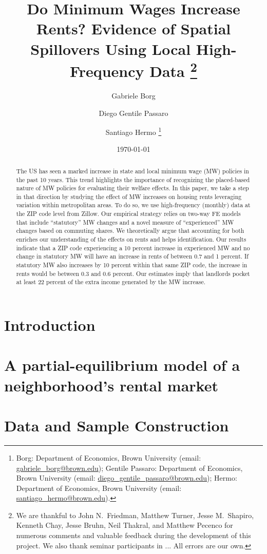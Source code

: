 \documentclass{article}
\title{ Do Minimum Wages Increase Rents? 
        Evidence of Spatial Spillovers Using Local High-Frequency Data
        \thanks{We are thankful to John N.\ Friedman, Matthew Turner, Jesse M.\ Shapiro, 
        Kenneth Chay, Jesse Bruhn, Neil Thakral, and Matthew Pecenco for numerous 
        comments and valuable feedback during the development of this project.
        We also thank seminar participants in ... %
        All errors are our own.}}
\author{Gabriele Borg \and Diego Gentile Passaro \and Santiago Hermo
        \footnote{
        Borg: Department of Economics, Brown University 
        (email: \url{gabriele_borg@brown.edu}); 
        Gentile Passaro: Department of Economics, Brown University 
        (email: \url{diego_gentile_passaro@brown.edu}); 
        Hermo: Department of Economics, Brown University 
        (email: \url{santiago_hermo@brown.edu}).}}
\date{\today}
\begin{document}
\maketitle

\begin{abstract}
    \noindent
    The US has seen a marked increase in state and local minimum wage (MW) policies 
    in the past 10 years.
    This trend highlights the importance of recognizing the placed-based nature of 
    MW policies for evaluating their welfare effects.
    In this paper, we take a step in that direction by studying the effect of MW 
    increases on housing rents leveraging variation within metropolitan areas.
    To do so, we use high-frequency (monthly) data at the ZIP code level from Zillow.
    Our empirical strategy relies on two-way FE models that include ``statutory'' 
    MW changes and a novel measure of ``experienced'' MW changes based on commuting
    shares.
    We theoretically argue that accounting for both enriches our understanding of 
    the effects on rents and helps identification.
    Our results indicate that a ZIP code experiencing a 10 percent increase in 
    experienced MW and no change in statutory MW will have an increase in rents of
    between 0.7 and 1 percent.
    If statutory MW also increases by 10 percent within that same ZIP code, the 
    increase in rents would be between 0.3 and 0.6 percent.
    Our estimates imply that landlords pocket at least 22 percent of the extra income 
    generated by the MW increase.
\end{abstract}

\vspace{5mm}


\clearpage

\section{Introduction}\label{sec:intro}
    

\section{A partial-equilibrium model of a neighborhood's rental market}\label{sec:model}
	

\section{Data and Sample Construction}\label{sec:data}
	
\end{document}
